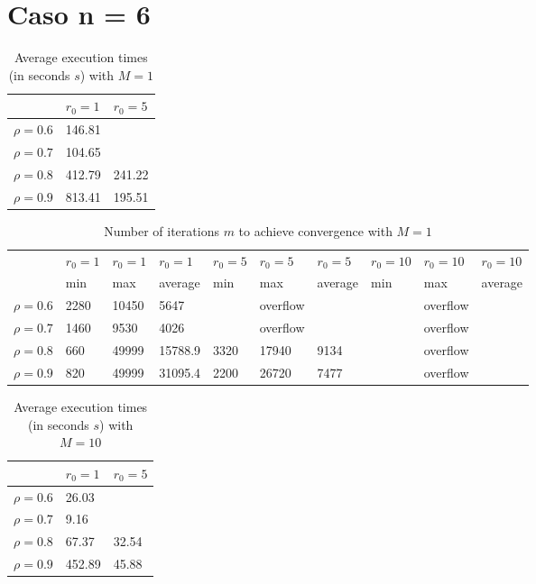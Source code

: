 \documentclass[a4paper,11pt,openright]{report}
\begin{document}
\section*{Caso n = 6} 
\begin{table}[H]
\centering
\addtolength{\leftskip}{-1.5cm}
\addtolength{\rightskip}{-1.5cm}
\begin{tabular}{|c|ll|}
\hline
$ $ & $r_0 = 1$ & $r_0 = 5$  \\
\hline
$\rho = 0.6$ & 146.81 & \\

$\rho = 0.7$ & 104.65 & \\

$\rho = 0.8$ & 412.79 & 241.22 \\

$\rho = 0.9$ & 813.41 & 195.51 \\
\hline
\end{tabular}
\caption{Average execution
 times (in seconds $s$) with $M = 1$}
\end{table}
\begin{table}[H]
\centering
\addtolength{\leftskip}{-1.5cm}
\addtolength{\rightskip}{-1.5cm}
\begin{tabular}{|c|lllllllll|}
\hline
$ $ & $r_0 = 1$ & $r_0 = 1$ & $r_0 = 1$ & $r_0 = 5$ & $r_0 = 5$ & $r_0 = 5$ & $r_0 = 10$ & $r_0 = 10$ & $r_0 = 10$  \\
$ $ & min & max & average & min & max & average & min & max & average \\ 
\hline
$\rho = 0.6$ & 2280 & 10450 & 5647 &  & overflow &  &  & overflow &  \\

$\rho = 0.7$ & 1460 & 9530 & 4026 &  & overflow &  &  & overflow &  \\

$\rho = 0.8$ & 660 & 49999 & 15788.9 & 3320 & 17940 & 9134 &  & overflow &  \\

$\rho = 0.9$ & 820 & 49999 & 31095.4 & 2200 & 26720 & 7477 &  & overflow &  \\
\hline
\end{tabular}
\caption{Number of iterations $m$ to achieve convergence with $M = 1$}
\end{table}
\begin{table}[H]
\centering
\addtolength{\leftskip}{-1.5cm}
\addtolength{\rightskip}{-1.5cm}
\begin{tabular}{|c|ll|}
\hline
$ $ & $r_0 = 1$ & $r_0 = 5$  \\
\hline
$\rho = 0.6$ & 26.03 & \\

$\rho = 0.7$ & 9.16 & \\

$\rho = 0.8$ & 67.37 & 32.54 \\

$\rho = 0.9$ & 452.89 & 45.88 \\
\hline
\end{tabular}
\caption{Average execution
 times (in seconds $s$) with $M = 10$}
\end{table}
\end{document}
